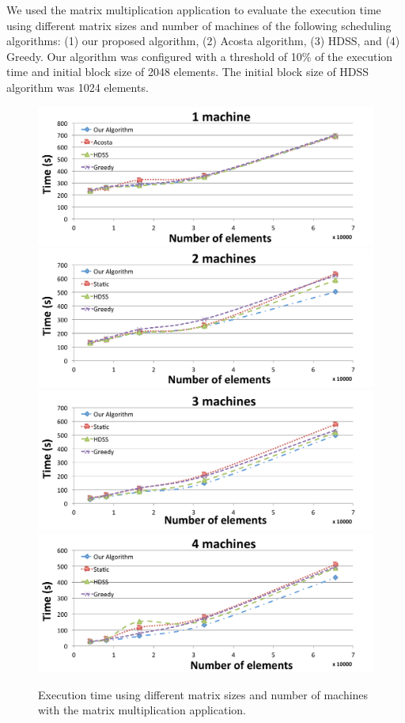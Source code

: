 \documentclass[journal]{IEEEtran}
\begin{document}
We used the matrix multiplication application to evaluate the execution time
using different matrix sizes and number of machines of the following scheduling
algorithms: (1) our proposed algorithm, (2) Acosta algorithm, (3) HDSS, and (4)
Greedy. Our algorithm was configured with a threshold of 10\% of the execution
time and initial block size of 2048 elements. The initial block size of HDSS
algorithm was 1024 elements.

\begin{figure}[htb]
	\begin{center}
	\centering
		\includegraphics[scale=0.3]{1machine.pdf} \quad
		\includegraphics[scale=0.3]{2machines.pdf} \quad
		\includegraphics[scale=0.3]{3machines.pdf} \quad
		\includegraphics[scale=0.3]{4machines.pdf} 
	\caption{Execution time using different matrix sizes and number of
          machines with the matrix multiplication application.}
	\label{fig:todosJuntos}
	\end{center}
\end{figure}
\end{document}

